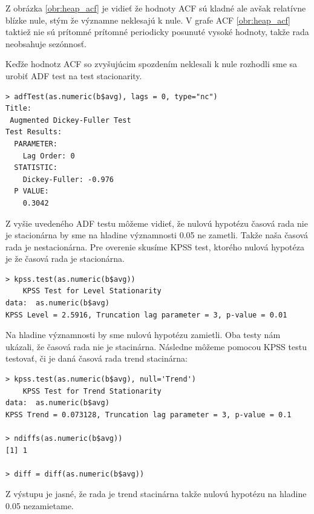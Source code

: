 \documentclass[12pt,a4paper,oneside,final]{article}
\theoremstyle{definition}
\theoremstyle{remark}
\numberwithin{equation}{section}
\begin{document}
Z obrázka \ref{obr:heap_acf} je vidieť že hodnoty ACF sú kladné ale avšak relatívne blízke
nule, stým že významne neklesajú k nule. 
V grafe ACF \ref{obr:heap_acf} taktiež nie sú prítomné prítomné periodicky posunuté vysoké hodnoty, 
takže rada neobsahuje sezónnosť.

Keďže hodnotz ACF so zvyšujúcim spozdením neklesali k nule rozhodli sme sa urobiť ADF test
na test stacionarity.

\begin{minipage}{\linewidth}
\begingroup
\fontsize{9pt}{7pt}\selectfont
\begin{verbatim}
> adfTest(as.numeric(b$avg), lags = 0, type="nc")
Title:
 Augmented Dickey-Fuller Test
Test Results:
  PARAMETER:
    Lag Order: 0
  STATISTIC:
    Dickey-Fuller: -0.976
  P VALUE:
    0.3042 
\end{verbatim}
\endgroup
\end{minipage}

Z vyšie uvedeného ADF testu môžeme vidieť, že nulovú hypotézu časová rada
nie je stacionárna by sme na hladine významnosti 0.05 ne zametli. Takže naša časová rada
je nestacionárna. Pre overenie skusíme KPSS test, ktorého nulová hypotéza je že časová 
rada je stacionárna.

\begin{minipage}{\linewidth}
\begingroup
\fontsize{9pt}{7pt}\selectfont
\begin{verbatim}
> kpss.test(as.numeric(b$avg))
	KPSS Test for Level Stationarity
data:  as.numeric(b$avg)
KPSS Level = 2.5916, Truncation lag parameter = 3, p-value = 0.01
\end{verbatim}
\endgroup
\end{minipage}
Na hladine významnosti by sme nulovú hypotézu zamietli. Oba testy nám ukázali, že časová
rada nie je stacinárna. 
Následne môžeme pomocou KPSS testu testovať, či je daná časová rada trend stacinárna:
\begin{minipage}{\linewidth}
\begingroup
\fontsize{9pt}{7pt}\selectfont
\begin{verbatim}
> kpss.test(as.numeric(b$avg), null='Trend')
	KPSS Test for Trend Stationarity
data:  as.numeric(b$avg)
KPSS Trend = 0.073128, Truncation lag parameter = 3, p-value = 0.1

> ndiffs(as.numeric(b$avg))
[1] 1

> diff = diff(as.numeric(b$avg))
\end{verbatim}
\endgroup
\end{minipage}
Z výstupu je jasné, že rada je trend stacinárna takže nulovú hypotézu na hladine 0.05
nezamietame.
\end{document}

